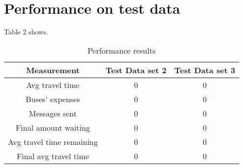 \section{Performance on test data}

Table 2 shows.

\begin{table*}[htbp]
\centering
\begin{tabular}{ |c|c|c|  }
 \hline
  Measurement & Test Data set 2 & Test Data set 3 \\
 \hline
  Avg travel time & 0 & 0 \\
  Buses' expenses & 0 & 0 \\
  Messages sent & 0 & 0 \\
  Final amount waiting & 0 & 0 \\
  Avg travel time remaining & 0 & 0 \\
  Final avg travel time & 0 & 0 \\
 \hline
\end{tabular}
\label{table:table2}
\caption{Performance results}
\end{table*}
